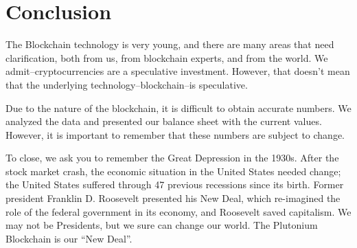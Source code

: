 \documentclass[12pt]{article}
\begin{document}
\section{Conclusion}
The Blockchain technology is very young, and there are many areas that need clarification, both from us, from blockchain experts, and from the world. We admit--cryptocurrencies are a speculative investment. However, that doesn't mean that the underlying technology--blockchain--is speculative.

Due to the nature of the blockchain, it is difficult to obtain accurate numbers. We analyzed the data and presented our balance sheet with the current values. However, it is important to remember that these numbers are subject to change.

To close, we ask you to remember the Great Depression in the 1930s. After the stock market crash, the economic situation in the United States needed change; the United States suffered through 47 previous recessions since its birth. Former president Franklin D. Roosevelt presented his New Deal, which re-imagined the role of the federal government in its economy, and Roosevelt saved capitalism. We may not be Presidents, but we sure can change our world. The Plutonium Blockchain is our ``New Deal''.
\end{document}
